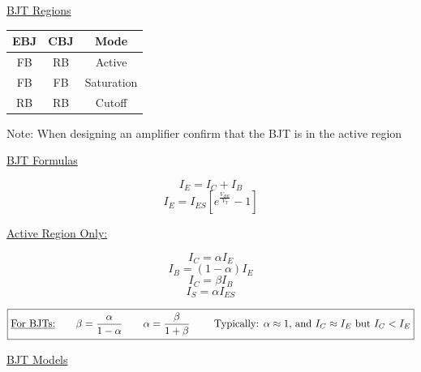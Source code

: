 \documentclass[12pt]{article}
\begin{document}
  \begin{multicols}{2}

    \begin{center}
      \underline{BJT Regions}
    \end{center}

    \begin{center}
      \begin{tabular}[H]{|c|c|c|}
        \hline
        EBJ & CBJ & Mode\\
        \hline
        FB & RB & Active\\
        \hline
        FB & FB & Saturation\\
        \hline
        RB & RB & Cutoff\\
        \hline
      \end{tabular}
    \end{center}

    Note: When designing an amplifier confirm that the BJT is in the active region

    \begin{center}
      \underline{BJT Formulas}
    \end{center}
    \vspace{-10pt}
    $$I_E=I_C+I_B$$
    \vspace{-10pt}
    $$I_{E}=I_{ES}\left[ e^{\frac{V_{BE}}{V_T}}-1 \right]$$
    \vspace{-20pt}
    \begin{center}
      \underline{Active Region Only:}
    \end{center}
    \vspace{-10pt}
    $$I_C=\alpha I_E$$
    \vspace{-25pt}
    $$I_B=(1-\alpha)I_E$$
    \vspace{-25pt}
    $$I_C=\beta I_B$$
    \vspace{-25pt}
    $$I_S=\alpha I_{ES}$$

  \end{multicols}

  \vspace{-30pt}

  $$\boxed{\text{\underline{For BJTs:}} \quad\quad\beta=\frac{\alpha}{1-\alpha}\quad\quad\alpha=\frac{\beta}{1+\beta}\quad\quad\text{ Typically: }\alpha\approx 1\text{, and }I_C\approx I_E\text{ but }I_C<I_E}$$

  \begin{center}
    \underline{BJT Models}
  \end{center}
\end{document}
